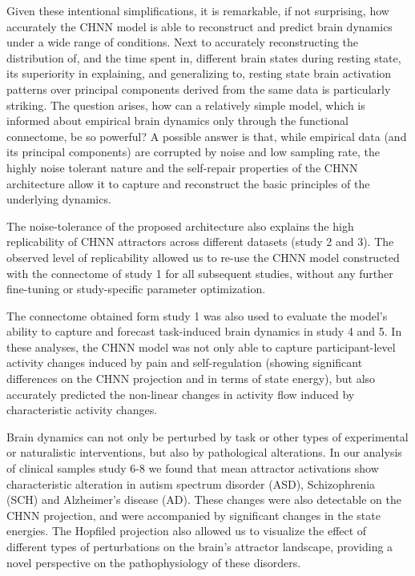 \documentclass{article}
\begin{document}
Given these intentional simplifications, it is remarkable, if not surprising, how accurately the CHNN model is able to
reconstruct and predict brain dynamics under a wide range of conditions. Next to accurately reconstructing the
distribution of, and the time spent in, different brain states during resting state, its superiority in explaining, and
generalizing to, resting state brain activation patterns over principal components derived from the same data is
particularly striking. The question arises, how can a relatively simple model, which is informed about empirical brain
dynamics only through the functional connectome, be so powerful? A possible answer is that, while empirical data (and
its principal components) are corrupted by noise and low sampling rate, the highly noise tolerant nature and the
self-repair properties of the CHNN architecture allow it to capture and reconstruct the basic principles of the
underlying dynamics.

The noise-tolerance of the proposed architecture also explains the high replicability of CHNN attractors across different
datasets (study 2 and 3). The observed level of replicability allowed us to re-use the CHNN model constructed with the
connectome of study 1 for all subsequent studies, without any further fine-tuning or study-specific parameter
optimization.

The connectome obtained form study 1 was also used to evaluate the model's ability to capture and forecast task-induced
brain dynamics in study 4 and 5. In these analyses, the CHNN model was not only able to capture participant-level
activity changes induced by pain and self-regulation (showing significant differences on the CHNN projection and in
terms of state energy), but also accurately predicted the non-linear changes in activity flow induced by characteristic
activity changes.

Brain dynamics can not only be perturbed by task or other types of experimental or naturalistic interventions, but also
by pathological alterations. In our analysis of clinical samples study 6-8 we found that mean attractor activations show
characteristic alteration in autism spectrum disorder (ASD), Schizophrenia (SCH) and Alzheimer's disease (AD). These
changes were also detectable on the CHNN projection, and were accompanied by significant changes in the state
energies. The Hopfiled projection also allowed us to visualize the effect of different types of perturbations on the
brain's attractor landscape, providing a novel perspective on the pathophysiology of these disorders.
\end{document}
